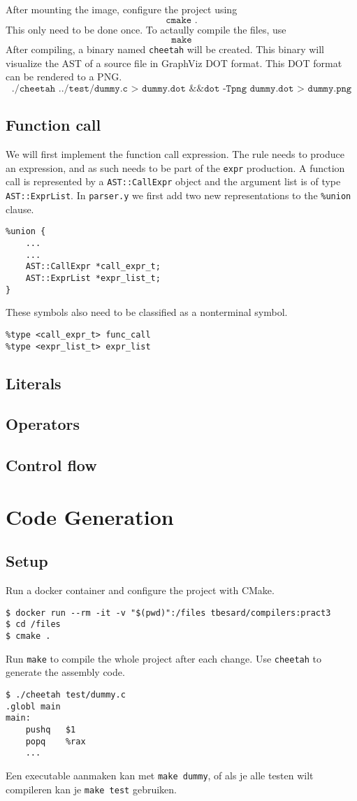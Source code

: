 \documentclass{report}
\begin{document}
	After mounting the image, configure the project using 
	$$\texttt{cmake .}$$
	This only need to be done once. To actaully compile the files, use
	$$\texttt{make}$$
	After compiling, a binary named \texttt{cheetah} will be created. This binary will visualize the AST of a source file in GraphViz DOT format. This DOT format can be rendered to a PNG.
	$$\texttt{./cheetah ../test/dummy.c > dummy.dot \&\& dot -Tpng dummy.dot > dummy.png}$$ 
	\section{Function call}
	We will first implement the function call expression. The rule needs to produce an expression, and as such needs to be part of the \texttt{expr} production. A function call is represented by a \texttt{AST::CallExpr} object and the argument list is of type \texttt{AST::ExprList}. In \texttt{parser.y} we first add two new representations to the \texttt{\%union} clause.
	\begin{lstlisting}
%union {
	...
	...
	AST::CallExpr *call_expr_t;
	AST::ExprList *expr_list_t;
}
	\end{lstlisting}
		These symbols also need to be classified as a nonterminal symbol.
	\begin{lstlisting}
%type <call_expr_t> func_call
%type <expr_list_t> expr_list
	\end{lstlisting}
	\section{Literals}
	\section{Operators}
	\section{Control flow}
	
	\chapter{Code Generation}
	\section{Setup}
	Run a docker container and configure the project with CMake.
	\begin{lstlisting}
$ docker run --rm -it -v "$(pwd)":/files tbesard/compilers:pract3
$ cd /files
$ cmake .
	\end{lstlisting}
	Run \texttt{make} to compile the whole project after each change. Use \texttt{cheetah} to generate the assembly code.
	\begin{lstlisting}
$ ./cheetah test/dummy.c
.globl main
main:
	pushq	$1
	popq	%rax
	...
	\end{lstlisting}
	Een executable aanmaken kan met \texttt{make dummy}, of als je alle testen wilt compileren kan je \texttt{make test} gebruiken.
	
\end{document}
